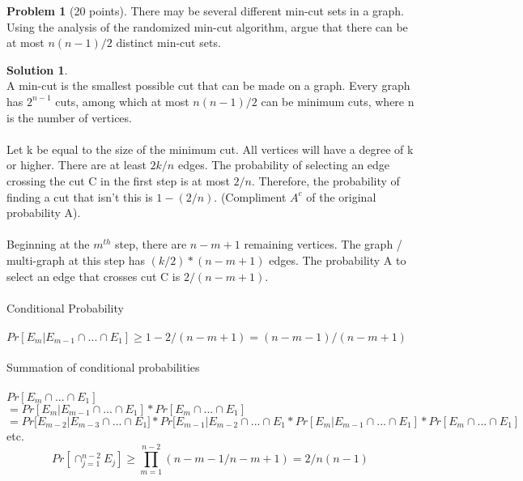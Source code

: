 \documentclass{article}
\theoremstyle{definition}
\newtheorem{problem}{Problem}
\newtheorem*{solution}{Solution}
\begin{document}
\newpage

\begin{problem}[20 points] 
  There may be several different min-cut sets in a graph. Using the
  analysis of the randomized min-cut algorithm, argue that there can
  be at most $n(n - 1)/2$ distinct min-cut sets.
\end{problem}
\begin{solution} \\
A min-cut is the smallest possible cut that can be made on a graph. Every graph has $2^{n-1}$ cuts, among which at most $n(n - 1)/2$ can be minimum cuts, where n is the number of vertices.\\
\\
Let k be equal to the size of the minimum cut. All vertices will have a degree of k or higher. There are at least $2k/n$ edges. The probability of selecting an edge crossing the cut C in the first step is at most $2/n$. Therefore, the probability of finding a cut that isn't this is $1 - (2/n)$. (Compliment $A^c$ of the original probability A).\\
\\
Beginning at the $m^{th}$ step, there are $n-m+1$ remaining vertices. The graph / multi-graph at this step has $(k/2)*(n-m+1)$ edges. The probability A to select an edge  that crosses cut C is $2/(n-m+1)$.\\
\\
Conditional Probability\\
\\
$Pr[E_{m}|E_{m-1} \cap ...\cap E_{1}] \geq 1 - 2/(n-m+1) = (n-m-1)/(n-m+1)$\\
\\
Summation of conditional probabilities\\
\\
$Pr[E_{m} \cap ...\cap E_{1}] $\\
$=Pr[E_{m}|E_{m-1} \cap ...\cap E_{1}]*Pr[E_{m} \cap ...\cap E_{1}] $\\
$=Pr[E_{m-2}|E_{m-3} \cap ...\cap E_{1}]*Pr[E_{m-1}|E_{m-2} \cap ...\cap E_{1}*Pr[E_{m}|E_{m-1} \cap ...\cap E_{1}]*Pr[E_{m} \cap ...\cap E_{1}]$\\
etc.\\


$$Pr[\cap^{n-2}_{j=1} E_{j}]\geq \prod_{m=1}^{n-2} (n-m-1/n-m+1) = 2/n(n-1)$$

\end{solution}

\newpage
\end{document}
